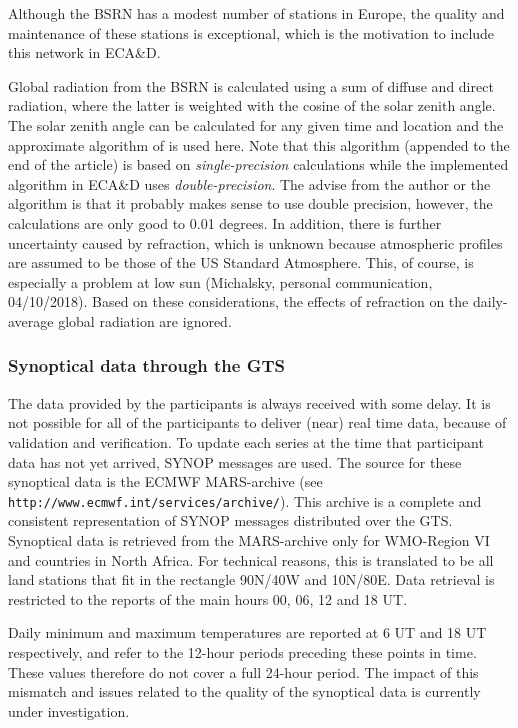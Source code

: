 \documentclass[a4paper,11pt]{article}
\begin{document}
Although the BSRN has a modest number of stations in Europe, the quality and maintenance of these stations is exceptional, which is the motivation to include this network
in ECA\&D.

Global radiation from the BSRN is calculated using a sum of diffuse and direct radiation, where the latter is weighted with the cosine of the solar zenith angle.
The solar zenith angle can be calculated for any given time and location and the approximate algorithm of \citet{michalsky:88} is used here. Note that this algorithm (appended
to the end of the article) is based on \emph{single-precision} calculations while the implemented algorithm in ECA\&D uses \emph{double-precision}. 
The advise from the author or the algorithm is that it probably makes sense to use double precision, however, the calculations are only good to 0.01 degrees. 
In addition, there is further uncertainty caused by refraction, which is unknown because atmospheric profiles are assumed to be
those of the US Standard Atmosphere. This, of course, is especially a problem at low sun (Michalsky, personal communication, 04/10/2018). Based on these considerations,
the effects of refraction on the daily-average global radiation are ignored.


\subsubsection{Synoptical data through the GTS}
\label{sec:data:design:GTS}

The data provided by the participants is always received with some
delay. It is not possible for all of the participants to deliver
(near) real time data, because of validation and verification. To
update each series at the time that participant data has not yet
arrived, SYNOP messages are used. The source for these synoptical data
is the ECMWF MARS-archive (see
{\tt http://www.ecmwf.int/services/archive/}). This archive is a complete
and consistent representation of SYNOP messages distributed over the
GTS. Synoptical data is retrieved from the MARS-archive only for
WMO-Region VI and countries in North Africa. For technical reasons,
this is translated to be all land stations that fit in the rectangle
90N/40W and 10N/80E. Data retrieval is restricted to the reports of
the main hours 00, 06, 12 and 18 UT.

Daily minimum and maximum temperatures are reported at 6 UT and 18 UT 
respectively, and refer to the 12-hour periods preceding these points in time. 
These values therefore do not cover a full 24-hour period. 
The impact of this mismatch and issues related to the quality of the synoptical data
is currently under investigation.
\end{document}

